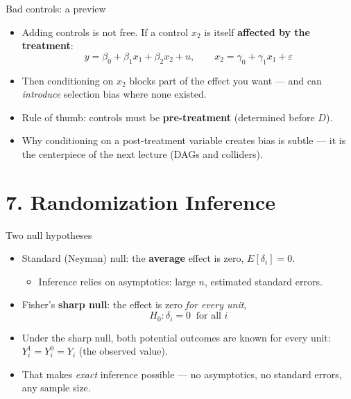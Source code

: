\documentclass[
  11pt,
  ignorenonframetext,
  aspectratio=169,
]{beamer}
\newcounter{none} %
\providecommand{\tightlist}{%
  \setlength{\itemsep}{0pt}\setlength{\parskip}{0pt}}
\begin{document}
\begin{frame}{Bad controls: a preview}
\protect{}\label{bad-controls-a-preview}
\begin{itemize}
\tightlist
\item
  Adding controls is not free. If a control \(x_2\) is itself
  \textbf{affected by the treatment}: \[
  y = \beta_0 + \beta_1 x_1 + \beta_2 x_2 + u, \qquad x_2 = \gamma_0 + \gamma_1 x_1 + \varepsilon
  \]
\item
  Then conditioning on \(x_2\) blocks part of the effect you want ---
  and can \emph{introduce} selection bias where none existed.
\item
  Rule of thumb: controls must be \textbf{pre-treatment} (determined
  before \(D\)).
\item
  Why conditioning on a post-treatment variable creates bias is subtle
  --- it is the centerpiece of the next lecture (DAGs and colliders).
\end{itemize}
\end{frame}

\section{7. Randomization Inference}\label{randomization-inference}

\begin{frame}{Two null hypotheses}
\protect{}\label{two-null-hypotheses}
\begin{itemize}
\tightlist
\item
  Standard (Neyman) null: the \textbf{average} effect is zero,
  \(E[\delta_i] = 0\).

  \begin{itemize}
  \tightlist
  \item
    Inference relies on asymptotics: large \(n\), estimated standard
    errors.
  \end{itemize}
\item
  Fisher's \textbf{sharp null}: the effect is zero \emph{for every
  unit}, \[
  H_0: \delta_i = 0 \;\; \text{for all } i
  \]
\item
  Under the sharp null, both potential outcomes are known for every
  unit: \(Y_i^1 = Y_i^0 = Y_i\) (the observed value).
\item
  That makes \emph{exact} inference possible --- no asymptotics, no
  standard errors, any sample size.
\end{itemize}
\end{frame}
\end{document}
